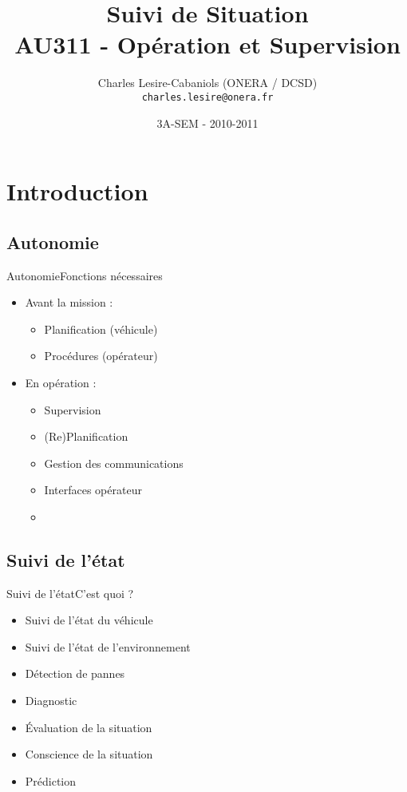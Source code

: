 \documentclass[compress]{beamer}
\title[SEM AU311 - Suivi de Situation]{{\Large Suivi de Situation}\\AU311 - Opération et Supervision}
\author[Charles Lesire]{Charles Lesire-Cabaniols (ONERA / DCSD)\\{\tt charles.lesire@onera.fr}}
\date[2010-2011]{3A-SEM - 2010-2011}
\begin{document}
\begin{frame}
\titlepage
\end{frame}

\begin{frame}
\tableofcontents[hidesubsections]
\end{frame}

\section{Introduction}

\begin{frame}
\end{frame}

\subsection{Autonomie}
\begin{frame}{Autonomie}{Fonctions nécessaires}
\begin{itemize}
\item Avant la mission : 
	\begin{itemize}
	\item Planification (véhicule)
	\item Procédures (opérateur)
	\end{itemize}
\item En opération :
	\begin{itemize}
	\item Supervision
	\item (Re)Planification
	\item Gestion des communications
	\item Interfaces opérateur
	\item {}
	\end{itemize}
\end{itemize}
\end{frame}


\subsection{Suivi de l'état}
\begin{frame}{Suivi de l'état}{C'est quoi ?}
\begin{itemize}
\item Suivi de l'état du véhicule
\item Suivi de l'état de l'environnement
\item Détection de pannes
\item Diagnostic
\item \'Evaluation de la situation
\item Conscience de la situation
\item Prédiction
\end{itemize}
\end{frame}
\end{document}
